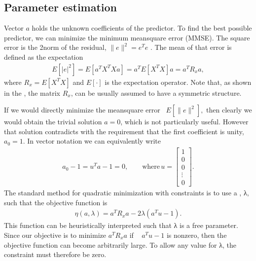 \documentclass[letterpaper,10pt,english]{jupyterBook}
\begin{document}
\subsection{Parameter estimation}
\label{\detokenize{Representations/Linear_prediction:parameter-estimation}}
\sphinxAtStartPar
Vector \(a\) holds the unknown coefficients of the predictor. To find the
best possible predictor, we can minimize the minimum mean\sphinxhyphen{}square error
(MMSE). The square error is the 2\sphinxhyphen{}norm of the residual, \(
\|e\|^2=e^T e \) . The mean of that error is defined as the
expectation
\begin{equation*}
\begin{split} E\left[|e|^2\right] = E\left[a^T X^T X a\right] = a^T
E\left[X^T X\right] a = a^T R_x a, \end{split}
\end{equation*}
\sphinxAtStartPar
where \( R_x = E\left[X^T X\right] \) and \(
E\left[\cdot\right] \) is the expectation operator. Note that, as
shown in the {\hyperref[\detokenize{Representations/Autocorrelation_and_autocovariance::doc}]{}}, the matrix
\(R_{x}\), can be usually assumed to have a symmetric
 structure.

\sphinxAtStartPar
If we would directly minimize the mean\sphinxhyphen{}square error  \(
E\left[\|e\|^2\right], \) then clearly we would obtain the
trivial solution \(a=0\), which is not particularly useful. However that
solution contradicts with the requirement that the first coefficient is
unity, \(a_{0}=1\). In vector notation we can equivalently write
\begin{equation*}
\begin{split} a_0-1=u^T a -1=0,
\qquad\text{where}\,u=\begin{bmatrix}1\\0\\0\\\vdots\\0\end{bmatrix}.
\end{split}
\end{equation*}
\sphinxAtStartPar
The standard method for quadratic minimization with constraints is to
use a , λ, such
that the objective function is
\begin{equation*}
\begin{split} \eta(a,\lambda) = a^T R_x a - 2\lambda\left(a^T u - 1\right).
\end{split}
\end{equation*}
\sphinxAtStartPar
This function can be heuristically interpreted such that λ is a free
parameter. Since our objective is to minimize \( a^T R_x a \) if   \(
a^T u - 1 \) is non\sphinxhyphen{}zero, then the objective function can become
arbitrarily large. To allow any value for λ, the constraint must
therefore be zero.
\end{document}
